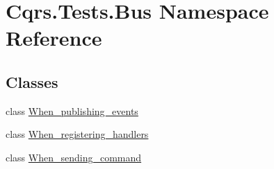 \hypertarget{namespaceCqrs_1_1Tests_1_1Bus}{}\section{Cqrs.\+Tests.\+Bus Namespace Reference}
\label{namespaceCqrs_1_1Tests_1_1Bus}
\subsection*{Classes}
\begin{DoxyCompactItemize}
\item 
class \hyperlink{classCqrs_1_1Tests_1_1Bus_1_1When__publishing__events}{When\+\_\+publishing\+\_\+events}
\item 
class \hyperlink{classCqrs_1_1Tests_1_1Bus_1_1When__registering__handlers}{When\+\_\+registering\+\_\+handlers}
\item 
class \hyperlink{classCqrs_1_1Tests_1_1Bus_1_1When__sending__command}{When\+\_\+sending\+\_\+command}
\end{DoxyCompactItemize}
